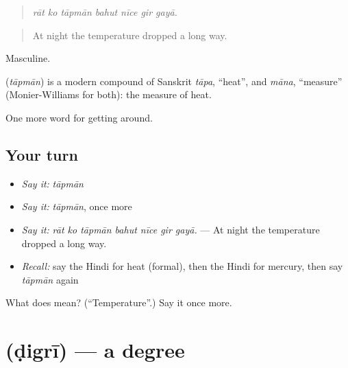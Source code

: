 \begin{quote}
      
\end{quote}

\begin{quote}
\emph{rāt ko tāpmān bahut nīce gir gayā.}
\end{quote}

\begin{quote}
At night the temperature dropped a long way.
\end{quote}

Masculine.

\begin{cousinweb}
\textbf{} (\emph{tāpmān}) is a modern compound of Sanskrit \emph{tāpa}, \textquotedblleft{}heat\textquotedblright{}, and \emph{māna}, \textquotedblleft{}measure\textquotedblright{} (Monier-Williams for both): the measure of heat.
\end{cousinweb}

\begin{grammarlens}[title={What you've built}]
One more word for getting around.
\end{grammarlens}

\subsection*{Your turn}
\begin{itemize}
\raggedright
  \item \emph{Say it:} \emph{tāpmān}
  \item \emph{Say it:} \emph{tāpmān}, once more
  \item \emph{Say it:} \emph{rāt ko tāpmān bahut nīce gir gayā.} — At night the temperature dropped a long way.
  \item \emph{Recall:} say the Hindi for heat (formal), then the Hindi for mercury, then say \emph{tāpmān} again
\end{itemize}

\begin{tcolorbox}[breakable,colback=teal!4,colframe=teal!35!black,title={Before you move on}]
What does  mean? (\textquotedblleft{}Temperature\textquotedblright{}.) Say it once more.
\end{tcolorbox}
\section[\texorpdfstring{\hi{डिग्री} (ḍigrī)}{डिग्री (ḍigrī)}]{ (ḍigrī) — a degree}

